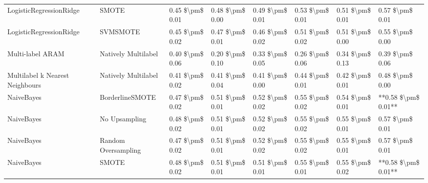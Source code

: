 \begin{tabular}{llllllll}
        LogisticRegressionRidge &                         SMOTE & 0.45 \$\textbackslash pm\$ 0.01 &           0.48 \$\textbackslash pm\$ 0.00 &       0.49 \$\textbackslash pm\$ 0.01 &        0.53 \$\textbackslash pm\$ 0.01 &                         0.51 \$\textbackslash pm\$ 0.01 &     0.57 \$\textbackslash pm\$ 0.01 \\
        LogisticRegressionRidge &                      SVMSMOTE & 0.45 \$\textbackslash pm\$ 0.02 &           0.47 \$\textbackslash pm\$ 0.01 &       0.46 \$\textbackslash pm\$ 0.02 &        0.51 \$\textbackslash pm\$ 0.02 &                         0.51 \$\textbackslash pm\$ 0.00 &     0.55 \$\textbackslash pm\$ 0.00 \\
               Multi-label ARAM &           Natively Multilabel & 0.40 \$\textbackslash pm\$ 0.06 &           0.20 \$\textbackslash pm\$ 0.10 &       0.33 \$\textbackslash pm\$ 0.05 &        0.26 \$\textbackslash pm\$ 0.06 &                         0.34 \$\textbackslash pm\$ 0.13 &     0.39 \$\textbackslash pm\$ 0.06 \\
Multilabel k Nearest Neighbours &           Natively Multilabel & 0.41 \$\textbackslash pm\$ 0.02 &           0.41 \$\textbackslash pm\$ 0.04 &       0.41 \$\textbackslash pm\$ 0.00 &        0.44 \$\textbackslash pm\$ 0.01 &                         0.42 \$\textbackslash pm\$ 0.01 &     0.48 \$\textbackslash pm\$ 0.00 \\
                     NaiveBayes &               BorderlineSMOTE & 0.47 \$\textbackslash pm\$ 0.02 &           0.51 \$\textbackslash pm\$ 0.01 &       0.52 \$\textbackslash pm\$ 0.02 &        0.55 \$\textbackslash pm\$ 0.02 &                         0.54 \$\textbackslash pm\$ 0.01 & **0.58 \$\textbackslash pm\$ 0.01** \\
                     NaiveBayes &                 No Upsampling & 0.48 \$\textbackslash pm\$ 0.02 &           0.51 \$\textbackslash pm\$ 0.01 &       0.52 \$\textbackslash pm\$ 0.02 &        0.55 \$\textbackslash pm\$ 0.02 &                         0.55 \$\textbackslash pm\$ 0.01 &     0.57 \$\textbackslash pm\$ 0.01 \\
                     NaiveBayes &           Random Oversampling & 0.47 \$\textbackslash pm\$ 0.02 &           0.51 \$\textbackslash pm\$ 0.01 &       0.52 \$\textbackslash pm\$ 0.02 &        0.55 \$\textbackslash pm\$ 0.02 &                         0.55 \$\textbackslash pm\$ 0.01 &     0.57 \$\textbackslash pm\$ 0.01 \\
                     NaiveBayes &                         SMOTE & 0.48 \$\textbackslash pm\$ 0.02 &           0.51 \$\textbackslash pm\$ 0.01 &       0.51 \$\textbackslash pm\$ 0.01 &        0.55 \$\textbackslash pm\$ 0.01 &                         0.55 \$\textbackslash pm\$ 0.02 & **0.58 \$\textbackslash pm\$ 0.01** \\

\end{tabular}
